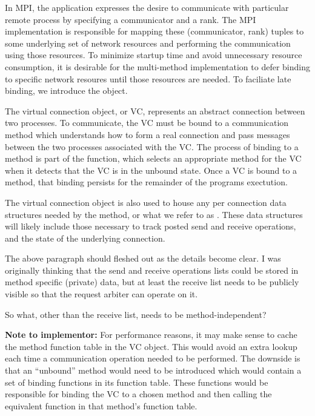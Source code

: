 In MPI, the application expresses the desire to communicate with particular
remote process by specifying a communicator and a rank.  The MPI implementation
is responsible for mapping these (communicator, rank) tuples to some underlying
set of network resources and performing the communication using those
resources.  To minimize startup time and avoid unnecessary resource
consumption, it is desirable for the multi-method implementation to defer
binding to specific network resoures until those resources are needed.  To
faciliate late binding, we introduce the  object.

The virtual connection object, or VC, represents an abstract connection between
two processes.  To communicate, the VC must be bound to a communication method
which understands how to form a real connection and pass messages between the
two processes associated with the VC.  The process of binding to a method is
part of the  function, which selects an
appropriate method for the VC when it detects that the VC is in the unbound
state.  Once a VC is bound to a method, that binding persists for the remainder
of the programs exectution.

The virtual connection object is also used to house any per connection data
structures needed by the method, or what we refer to as .  These data structures will likely include those necessary to track
posted send and receive operations, and the state of the underlying connection.

\begin{cmt}[BRT]
  The above paragraph should fleshed out as the details become clear. I was
  originally thinking that the send and receive operations lists could be
  stored in method specific (private) data, but at least the receive list needs
  to be publicly visible so that the request arbiter can operate on it.
\end{cmt}

\begin{cmt}[ROB]
  So what, other than the receive list, needs to be method-independent?
\end{cmt}

\textbf{Note to implementor:} For performance reasons, it may make sense to
cache the method function table in the VC object.  This would avoid an extra
lookup each time a communication operation needed to be performed.  The
downside is that an ``unbound'' method would need to be introduced which would
contain a set of binding functions in its function table.  These functions
would be responsible for binding the VC to a chosen method and then calling the
equivalent function in that method's function table.

